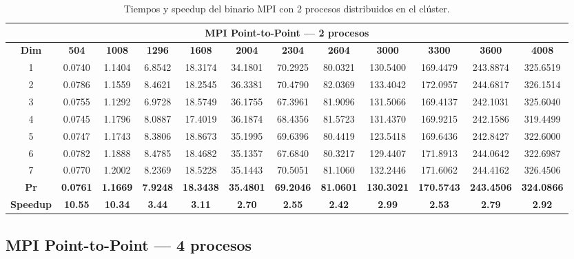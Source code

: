\documentclass{article}
\begin{document}
\begin{table}[H]
\centering
\tiny
\begin{tabular}{|c|c|c|c|c|c|c|c|c|c|c|c|}
\hline
\multicolumn{12}{|c|}{\textbf{MPI Point-to-Point --- 2 procesos}} \\
\hline
\textbf{Dim} & \textbf{504} & \textbf{1008} & \textbf{1296} & \textbf{1608} & \textbf{2004} & \textbf{2304} & \textbf{2604} & \textbf{3000} & \textbf{3300} & \textbf{3600} & \textbf{4008} \\
\hline
1 & 0.0740 & 1.1404 & 6.8542 & 18.3174 & 34.1801 & 70.2925 & 80.0321 & 130.5400 & 169.4479 & 243.8874 & 325.6519 \\
2 & 0.0786 & 1.1559 & 8.4621 & 18.2545 & 36.3381 & 70.4790 & 82.0369 & 133.4042 & 172.0957 & 244.6817 & 326.1514 \\
3 & 0.0755 & 1.1292 & 6.9728 & 18.5749 & 36.1755 & 67.3961 & 81.9096 & 131.5066 & 169.4137 & 242.1031 & 325.6040 \\
4 & 0.0745 & 1.1796 & 8.0887 & 17.4019 & 36.1874 & 68.4356 & 81.5723 & 131.4370 & 169.9215 & 242.1586 & 319.4499 \\
5 & 0.0747 & 1.1743 & 8.3806 & 18.8673 & 35.1995 & 69.6396 & 80.4419 & 123.5418 & 169.6436 & 242.8427 & 322.6000 \\
6 & 0.0782 & 1.1888 & 8.4785 & 18.4682 & 35.1357 & 67.6840 & 80.3217 & 129.4407 & 171.8913 & 244.0642 & 322.6987 \\
7 & 0.0770 & 1.2002 & 8.2369 & 18.5228 & 35.1443 & 70.5051 & 81.1060 & 132.2446 & 171.6062 & 244.4162 & 326.4506 \\
\hline
\textbf{Pr} & \textbf{0.0761} & \textbf{1.1669} & \textbf{7.9248} & \textbf{18.3438} & \textbf{35.4801} & \textbf{69.2046} & \textbf{81.0601} & \textbf{130.3021} & \textbf{170.5743} & \textbf{243.4506} & \textbf{324.0866} \\
\hline
\textbf{Speedup} & \textbf{10.55} & \textbf{10.34} & \textbf{3.44} & \textbf{3.11} & \textbf{2.70} & \textbf{2.55} & \textbf{2.42} & \textbf{2.99} & \textbf{2.53} & \textbf{2.79} & \textbf{2.92} \\
\hline
\end{tabular}
\caption{Tiempos y speedup del binario MPI con 2 procesos distribuidos en el clúster.}
\label{tab:p2p2}
\end{table}

\subsection{MPI Point-to-Point --- 4 procesos}
\end{document}
